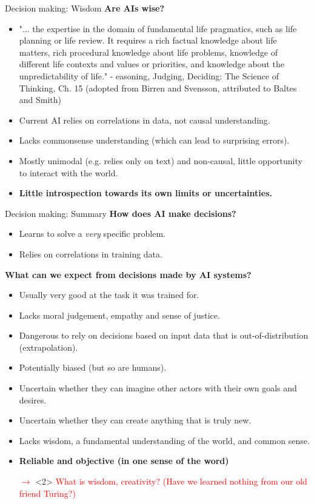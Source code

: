 \documentclass[8pt]{beamer}
\begin{document}
	\begin{frame}[t]{Decision making: Wisdom}
		\textbf{Are AIs wise?}
		\begin{itemize}
			\item "... the expertise in the domain of fundamental life pragmatics, such as life planning or life review. It requires a rich factual knowledge about life matters, rich procedural knowledge about life problems, knowledge of different life contexts and values or priorities, and knowledge about the unpredictability of life." - easoning, Judging, Deciding: The Science of Thinking, Ch. 15 (adopted from Birren and Svensson, attributed to Baltes and Smith)
			\item <2>Current AI relies on correlations in data, not causal understanding.
			\item <2>Lacks commonsense understanding (which can lead to surprising errors).
			\item <2>Mostly unimodal (e.g. relies only on text) and non-causal, little opportunity to interact with the world.
			\item <2>\textbf{Little introspection towards its own limits or uncertainties.}
		\end{itemize}
	\end{frame}

	\begin{frame}[t]{Decision making: Summary}
		\textbf{How does AI make decisions?}
		\begin{itemize}
			\item Learns to solve a \textit{very} specific problem.
			\item Relies on correlations in training data.
		\end{itemize}
		\textbf{What can we expect from decisions made by AI systems?}
		\begin{itemize}
			\item Usually very good at the task it was trained for.
			\item Lacks moral judgement, empathy and sense of justice.
			\item Dangerous to rely on decisions based on input data that is out-of-distribution (extrapolation).
			\item Potentially biased (but so are humans).
			\item Uncertain whether they can imagine other actors with their own goals and desires.
			\item Uncertain whether they can create anything that is truly new.
			\item Lacks wisdom, a fundamental understanding of the world, and common sense.
			\item \textbf{Reliable and objective (in one sense of the word)}
			\item[\textcolor{red}{$\rightarrow$}] <2> \textcolor{red}{What is wisdom, creativity? (Have we learned nothing from our old friend Turing?)}
		\end{itemize}
	\end{frame}
\end{document}
